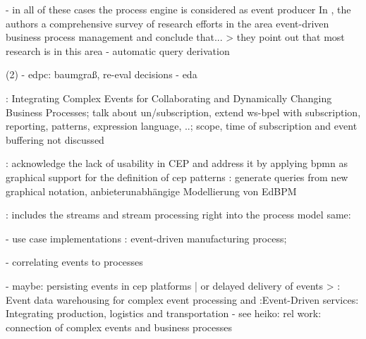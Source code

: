 - in all of these cases the process engine is considered as event producer
In \cite{Krumeich2014EventDrivenBP}, the authors a comprehensive survey of research efforts in the area event-driven business process management and conclude that... > they point out that most research is in this area
- automatic query derivation

(2)
- edpc: baumgraß, re-eval decisions
- eda

\cite{von2010integrating}: Integrating Complex Events for Collaborating and Dynamically Changing Business Processes; talk about un/subscription, extend ws-bpel with subscription, reporting, patterns, expression language, ..; scope, time of subscription and event buffering not discussed

\cite{Kunz2010}: acknowledge the lack of usability in CEP and address it by applying bpmn as graphical support for the definition of cep patterns
\cite{gabriel2016konzeptionelle}: generate queries from new graphical notation, anbieterunabhängige Modellierung von EdBPM


\cite{appel2014modeling}: includes the streams and stream processing right into the process model
same: \cite{biornstad2006control}


- use case implementations
\cite{estruch2012event}: event-driven manufacturing process; 




- correlating events to processes

- maybe: persisting events in cep platforms | or delayed delivery of events
> \cite{roth2010event}: Event data warehousing for complex event processing and \cite{buchmann2010event}:Event-Driven services: Integrating production, logistics and transportation
- see heiko: rel work: connection of complex events and business processes

